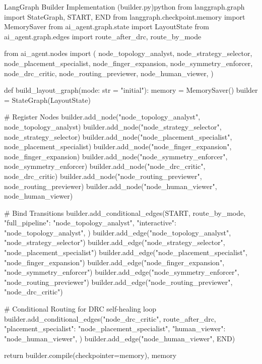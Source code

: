 \begin{thesiscode}{LangGraph Builder Implementation (builder.py)\label{lst:graph_builder}}{python}
from langgraph.graph import StateGraph, START, END
from langgraph.checkpoint.memory import MemorySaver
from ai_agent.graph.state import LayoutState
from ai_agent.graph.edges import route_after_drc, route_by_mode

from ai_agent.nodes import (
    node_topology_analyst,
    node_strategy_selector,
    node_placement_specialist,
    node_finger_expansion,
    node_symmetry_enforcer,
    node_drc_critic,
    node_routing_previewer,
    node_human_viewer,
)

def build_layout_graph(mode: str = "initial"):
    memory = MemorySaver()
    builder = StateGraph(LayoutState)

    # Register Nodes
    builder.add_node("node_topology_analyst", node_topology_analyst)
    builder.add_node("node_strategy_selector", node_strategy_selector)
    builder.add_node("node_placement_specialist", node_placement_specialist)
    builder.add_node("node_finger_expansion", node_finger_expansion)
    builder.add_node("node_symmetry_enforcer", node_symmetry_enforcer)
    builder.add_node("node_drc_critic", node_drc_critic)
    builder.add_node("node_routing_previewer", node_routing_previewer)
    builder.add_node("node_human_viewer", node_human_viewer)

    # Bind Transitions
    builder.add_conditional_edges(START, route_by_mode, {
        "full_pipeline": "node_topology_analyst",
        "interactive":   "node_topology_analyst",
    })
    builder.add_edge("node_topology_analyst", "node_strategy_selector")
    builder.add_edge("node_strategy_selector", "node_placement_specialist")
    builder.add_edge("node_placement_specialist", "node_finger_expansion")
    builder.add_edge("node_finger_expansion", "node_symmetry_enforcer")
    builder.add_edge("node_symmetry_enforcer", "node_routing_previewer")
    builder.add_edge("node_routing_previewer", "node_drc_critic")

    # Conditional Routing for DRC self-healing loop
    builder.add_conditional_edges("node_drc_critic", route_after_drc, {
        "placement_specialist": "node_placement_specialist",
        "human_viewer": "node_human_viewer",
    })
    builder.add_edge("node_human_viewer", END)

    return builder.compile(checkpointer=memory), memory
\end{thesiscode}

